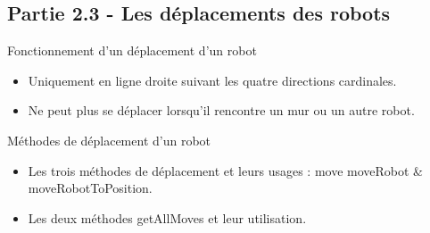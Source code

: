 \documentclass{beamer} %
\begin{document}
	\subsection{Partie 2.3 - Les déplacements des robots}
\begin{frame}[plain]
\begin{alertblock}{Fonctionnement d'un déplacement d'un robot}
	\begin{itemize}
		\item Uniquement en ligne droite suivant les quatre directions cardinales.
		\item Ne peut plus se déplacer lorsqu'il rencontre un mur ou un autre robot.
	\end{itemize}
\end{alertblock}
\begin{alertblock}{Méthodes de déplacement d'un robot}
	\begin{itemize}
		\item Les trois méthodes de déplacement et leurs usages : move moveRobot \& moveRobotToPosition.
		\item Les deux méthodes getAllMoves et leur utilisation.
	\end{itemize}
\end{alertblock}
\end{frame}
\end{document}

